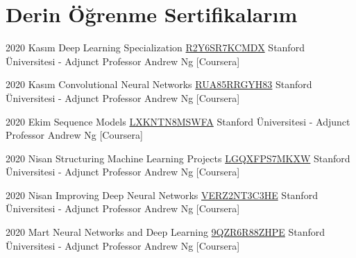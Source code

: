 \documentclass[]{cv-style} %
\begin{document}
\section{Derin Öğrenme Sertifikalarım}
\begin{entrylist}
    
    \entry
    {2020 Kasım}
    {Deep Learning Specialization}
    {\href{https://www.coursera.org/account/accomplishments/specialization/certificate/R2Y6SR7KCMDX}{R2Y6SR7KCMDX}}
    {Stanford Üniversitesi - Adjunct Professor Andrew Ng [Coursera]}
    
    \entry
    {2020 Kasım}
    {Convolutional Neural Networks}
    {\href{https://www.coursera.org/account/accomplishments/certificate/RUA85RRGYH83}{RUA85RRGYH83}}
    {Stanford Üniversitesi - Adjunct Professor Andrew Ng [Coursera]}
    
    \entry
    {2020 Ekim}
    {Sequence Models}
    {\href{https://www.coursera.org/account/accomplishments/certificate/LXKNTN8MSWFA}{LXKNTN8MSWFA}}
    {Stanford Üniversitesi - Adjunct Professor Andrew Ng [Coursera]}
    
    \entry
    {2020 Nisan}
    {Structuring Machine Learning Projects}
    {\href{https://www.coursera.org/account/accomplishments/certificate/LGQXFPS7MKXW}{LGQXFPS7MKXW}}
    {Stanford Üniversitesi - Adjunct Professor Andrew Ng [Coursera]}
    
    \entry
    {2020 Nisan}
    {Improving Deep Neural Networks}
    {\href{https://www.coursera.org/account/accomplishments/certificate/VERZ2NT3C3HE}{VERZ2NT3C3HE}}
    {Stanford Üniversitesi - Adjunct Professor Andrew Ng [Coursera]}
    
    \entry
    {2020 Mart}
    {Neural Networks and Deep Learning}
    {\href{https://www.coursera.org/account/accomplishments/verify/9QZR6R88ZHPE}{9QZR6R88ZHPE}}
    {Stanford Üniversitesi - Adjunct Professor Andrew Ng [Coursera]}
    
\end{entrylist}
\end{document}
